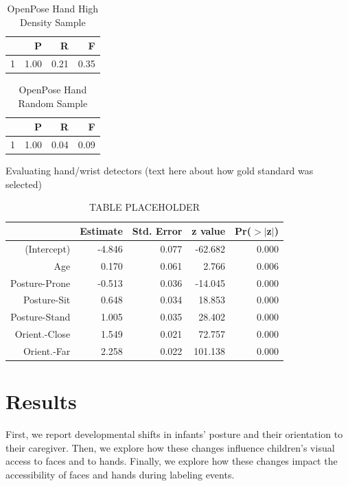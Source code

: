 \documentclass[10pt, letterpaper]{article}
\begin{document}
\begin{table}[H]
\centering
\begin{tabular}{rrrr}
  \hline
 & P & R & F \\ 
  \hline
1 & 1.00 & 0.21 & 0.35 \\ 
   \hline
\end{tabular}
\caption{OpenPose Hand High Density Sample} 
\end{table}\begin{table}[H]
\centering
\begin{tabular}{rrrr}
  \hline
 & P & R & F \\ 
  \hline
1 & 1.00 & 0.04 & 0.09 \\ 
   \hline
\end{tabular}
\caption{OpenPose Hand Random Sample} 
\end{table}

Evaluating hand/wrist detectors (text here about how gold standard was
selected)

\begin{table}[H]
\centering
\begin{tabular}{rrrrr}
  \hline
 & Estimate & Std. Error & z value & Pr($>$$|$z$|$) \\ 
  \hline
(Intercept) & -4.846 & 0.077 & -62.682 & 0.000 \\ 
  Age & 0.170 & 0.061 & 2.766 & 0.006 \\ 
  Posture-Prone & -0.513 & 0.036 & -14.045 & 0.000 \\ 
  Posture-Sit & 0.648 & 0.034 & 18.853 & 0.000 \\ 
  Posture-Stand & 1.005 & 0.035 & 28.402 & 0.000 \\ 
  Orient.-Close & 1.549 & 0.021 & 72.757 & 0.000 \\ 
  Orient.-Far & 2.258 & 0.022 & 101.138 & 0.000 \\ 
   \hline
\end{tabular}
\caption{TABLE PLACEHOLDER} 
\end{table}

\section{Results}\label{results}

First, we report developmental shifts in infants' posture and their
orientation to their caregiver. Then, we explore how these changes
influence children's visual access to faces and to hands. Finally, we
explore how these changes impact the accessibility of faces and hands
during labeling events.
\end{document}
